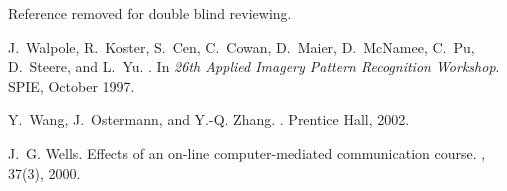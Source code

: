 \documentclass{sig-alternate}
\begin{document}
\begin{thebibliography}{10}
Reference removed for double blind reviewing.

J.~Walpole, R.~Koster, S.~Cen, C.~Cowan, D.~Maier, D.~McNamee, C.~Pu,
  D.~Steere, and L.~Yu.
.
\newblock In {\em 26th Applied Imagery Pattern Recognition Workshop}. SPIE,
  October 1997.

Y.~Wang, J.~Ostermann, and Y.-Q. Zhang.
.
\newblock Prentice Hall, 2002.

J.~G. Wells.
\newblock Effects of an on-line computer-mediated communication course.
, 37(3), 2000.

\end{thebibliography}

\balancecolumns 
\end{document}
